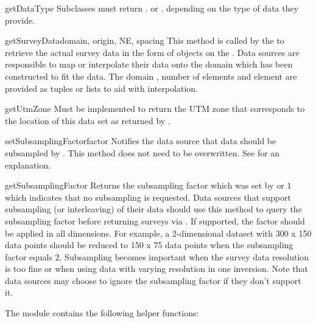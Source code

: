 \begin{methoddesc}[DataSource]{getDataType}{}
Subclasses must return . or
. depending on the type of data they provide.
\end{methoddesc}

\begin{methoddesc}[DataSource]{getSurveyData}{domain, origin, NE, spacing}
This method is called by the  to retrieve the actual survey
data in the form of \Data objects on the .
Data sources are responsible to map or interpolate their data onto the domain
which has been constructed to fit the data.
The domain , number of elements  and element
 are provided as tuples or lists to aid with interpolation.
\end{methoddesc}

\begin{methoddesc}[DataSource]{getUtmZone}{}
Must be implemented to return the UTM zone that corresponds to the location of
this data set as returned by .
\end{methoddesc}

\begin{methoddesc}[DataSource]{setSubsamplingFactor}{factor}
Notifies the data source that data should be subsampled by .
This method does not need to be overwritten.
See  for an explanation.
\end{methoddesc}

\begin{methoddesc}[DataSource]{getSubsamplingFactor}{}
Returns the subsampling factor which was set by 
or $1$ which indicates that no subsampling is requested.
Data sources that support subsampling (or interleaving) of their data should use
this method to query the subsampling factor before returning surveys via
. If supported, the factor should be applied in all
dimensions. For example, a 2-dimensional dataset with 300 x 150 data points
should be reduced to 150 x 75 data points when the subsampling factor equals $2$.
Subsampling becomes important when the survey data resolution is too fine or
when using data with varying resolution in one inversion.
Note that data sources may choose to ignore the subsampling factor if they
don't support it.
\end{methoddesc}

\vspace{1em}\noindent The  module contains the following helper
functions:

